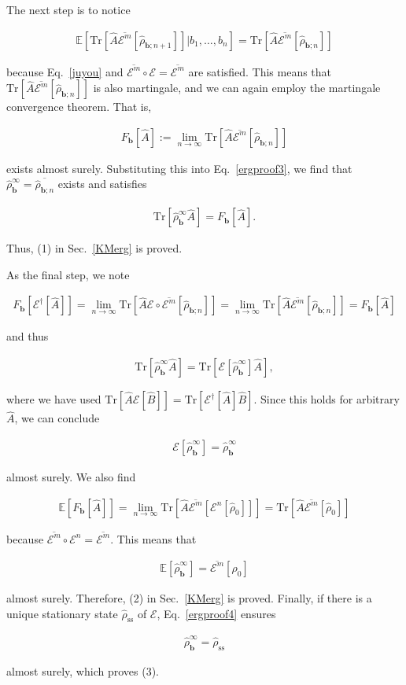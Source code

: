 \documentclass[preprint,pteplogo]{ptephy_v2}%
\numberwithin{equation}{section}
\theoremstyle{definition}
\newcommand{\av}[1]{\overline{#1}}
\newcommand{\ml}[1]{\mathcal{#1}}
\newcommand{\mr}[1]{\mathrm{#1}}
\newcommand{\mbb}[1]{\mathbb{#1}}
\newcommand{\lrl}[1]{\left[ #1 \right]}
\newcommand{\aln}[1]{
\begin{align}
#1
\end{align}
}
\newcommand{\ra}{\rightarrow}
\newcommand{\Tr}{\mr{Tr}}
\begin{document}
The next step is to notice
\aln{
\mbb{E}\lrl{\Tr\lrl{\hat{A}\av{\ml{E}^m}[\hat{\rho}_{\bm{b};n+1}]}|b_1,\ldots,b_n}=\Tr\lrl{\hat{A}\av{\ml{E}^m}[\hat{\rho}_{\bm{b};n}]}
}
because Eq.~\eqref{juyou} and $\av{\ml{E}^m}\circ \ml{E}=\av{\ml{E}^m}$ are satisfied.
This means that $\Tr\lrl{\hat{A}\av{\ml{E}^m}[\hat{\rho}_{\bm{b};n}]}$ is also martingale, and we can again employ the martingale convergence theorem.
That is,
\aln{
F_{\bm{b}}[\hat{A}]:=\lim_{n\ra\infty}\Tr\lrl{\hat{A}\av{\ml{E}^m}[\hat{\rho}_{\bm{b};n}]}
}
exists almost surely.
Substituting this into Eq.~\eqref{ergproof3}, we find that $\hat{\rho}_{\bm{b}}^\mr{\infty}=\overline{\hat{\rho}_{\bm{b};n}}$ exists and satisfies
\aln{
\Tr[\hat{\rho}_{\bm{b}}^\infty\hat{A}]=F_{\bm{b}}[\hat{A}].
}
Thus, (1) in Sec.~\ref{KMerg} is proved.

As the final step, we note
\aln{
F_{\bm{b}}[\ml{E}^\dag[\hat{A}]]
=\lim_{n\ra\infty}\Tr\lrl{\hat{A}\ml{E}\circ\av{\ml{E}^m}[\hat{\rho}_{\bm{b};n}]}
=\lim_{n\ra\infty}\Tr\lrl{\hat{A}\av{\ml{E}^m}[\hat{\rho}_{\bm{b};n}]}
=F_{\bm{b}}[\hat{A}]
}
and thus
\aln{
\Tr[\hat{\rho}_{\bm{b}}^\infty\hat{A}]=\Tr[\ml{E}[\hat{\rho}_{\bm{b}}^\infty]\hat{A}],
}
where we have used $\Tr[\hat{A}\ml{E}[\hat{B}]]=\Tr[\ml{E}^\dag[\hat{A}]\hat{B}]$.
Since this holds for arbitrary $\hat{A}$, we can conclude
\aln{\label{ergproof4}
\ml{E}[\hat{\rho}_{\bm{b}}^\infty]=\hat{\rho}_{\bm{b}}^\infty
}
almost surely.
We also find
\aln{
\mbb{E}\lrl{F_{\bm{b}}[\hat{A}]}=\lim_{n\ra\infty}\Tr\lrl{\hat{A}\av{\ml{E}^m}[\ml{E}^n[\hat{\rho}_0]]}=\Tr\lrl{\hat{A}\av{\ml{E}^m}[\hat{\rho}_0]}
}
because $\av{\ml{E}^m}\circ \ml{E}^n=\av{\ml{E}^m}$.
This means that
\aln{
\mbb{E}\lrl{\hat{\rho}_{\bm{b}}^\infty}=\av{\ml{E}^m}[\hat{\rho}_0]
}
almost surely.
Therefore, (2) in Sec.~\ref{KMerg} is proved.
Finally, if there is a unique stationary state $\hat{\rho}_\mr{ss}$ of $\ml{E}$, Eq.~\eqref{ergproof4} ensures
\aln{
\hat{\rho}_{\bm{b}}^\infty=\hat{\rho}_\mr{ss}
}
almost surely, which proves (3).
\end{document}
